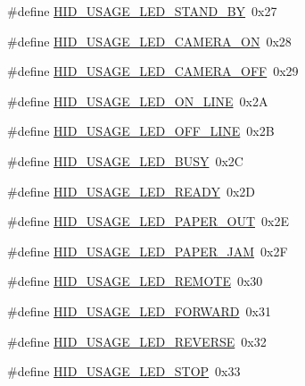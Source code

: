 \begin{DoxyCompactItemize}
\item 
\#define \hyperlink{group___u_s_b_d___h_i_d_gad82fd57bc472dd30b47e712ca83647ce}{H\+I\+D\+\_\+\+U\+S\+A\+G\+E\+\_\+\+L\+E\+D\+\_\+\+S\+T\+A\+N\+D\+\_\+\+BY}~0x27
\item 
\#define \hyperlink{group___u_s_b_d___h_i_d_ga1a69b383c0a897a64f1dbb771ccdfa5d}{H\+I\+D\+\_\+\+U\+S\+A\+G\+E\+\_\+\+L\+E\+D\+\_\+\+C\+A\+M\+E\+R\+A\+\_\+\+ON}~0x28
\item 
\#define \hyperlink{group___u_s_b_d___h_i_d_ga89791b1709215a18b35cda2e0a66c8fa}{H\+I\+D\+\_\+\+U\+S\+A\+G\+E\+\_\+\+L\+E\+D\+\_\+\+C\+A\+M\+E\+R\+A\+\_\+\+O\+FF}~0x29
\item 
\#define \hyperlink{group___u_s_b_d___h_i_d_ga307a23de9b1083caade208deff40b920}{H\+I\+D\+\_\+\+U\+S\+A\+G\+E\+\_\+\+L\+E\+D\+\_\+\+O\+N\+\_\+\+L\+I\+NE}~0x2A
\item 
\#define \hyperlink{group___u_s_b_d___h_i_d_ga6da65a1c9447187f5430c6772221da77}{H\+I\+D\+\_\+\+U\+S\+A\+G\+E\+\_\+\+L\+E\+D\+\_\+\+O\+F\+F\+\_\+\+L\+I\+NE}~0x2B
\item 
\#define \hyperlink{group___u_s_b_d___h_i_d_ga157655e74dad2e60c7929233a52e3d77}{H\+I\+D\+\_\+\+U\+S\+A\+G\+E\+\_\+\+L\+E\+D\+\_\+\+B\+U\+SY}~0x2C
\item 
\#define \hyperlink{group___u_s_b_d___h_i_d_ga98027a4d156282b93051f21d18be0003}{H\+I\+D\+\_\+\+U\+S\+A\+G\+E\+\_\+\+L\+E\+D\+\_\+\+R\+E\+A\+DY}~0x2D
\item 
\#define \hyperlink{group___u_s_b_d___h_i_d_ga593e39843a519d683a85f6b394730385}{H\+I\+D\+\_\+\+U\+S\+A\+G\+E\+\_\+\+L\+E\+D\+\_\+\+P\+A\+P\+E\+R\+\_\+\+O\+UT}~0x2E
\item 
\#define \hyperlink{group___u_s_b_d___h_i_d_ga689e4d119f74e5c53075ad779d6e5136}{H\+I\+D\+\_\+\+U\+S\+A\+G\+E\+\_\+\+L\+E\+D\+\_\+\+P\+A\+P\+E\+R\+\_\+\+J\+AM}~0x2F
\item 
\#define \hyperlink{group___u_s_b_d___h_i_d_ga82eef373cb43c0bdf6dabe0b82f67f04}{H\+I\+D\+\_\+\+U\+S\+A\+G\+E\+\_\+\+L\+E\+D\+\_\+\+R\+E\+M\+O\+TE}~0x30
\item 
\#define \hyperlink{group___u_s_b_d___h_i_d_ga3a3f725a341f5265875f8690d54d4517}{H\+I\+D\+\_\+\+U\+S\+A\+G\+E\+\_\+\+L\+E\+D\+\_\+\+F\+O\+R\+W\+A\+RD}~0x31
\item 
\#define \hyperlink{group___u_s_b_d___h_i_d_ga3d2000b30d154ff1a041cd77aef083ed}{H\+I\+D\+\_\+\+U\+S\+A\+G\+E\+\_\+\+L\+E\+D\+\_\+\+R\+E\+V\+E\+R\+SE}~0x32
\item 
\#define \hyperlink{group___u_s_b_d___h_i_d_ga05bd9837d9c360ba67a3cff43f664698}{H\+I\+D\+\_\+\+U\+S\+A\+G\+E\+\_\+\+L\+E\+D\+\_\+\+S\+T\+OP}~0x33

\end{DoxyCompactItemize}
